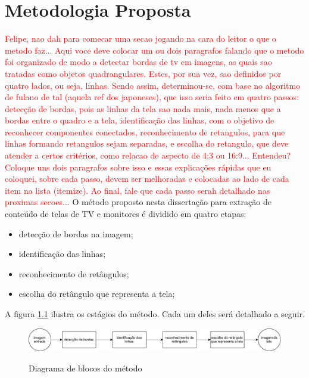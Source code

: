 
\chapter{Metodologia Proposta} \label{met}

\textcolor{red}{Felipe, nao dah para comecar uma secao jogando na cara do leitor o que o metodo faz... Aqui voce deve colocar um ou dois paragrafos falando que o metodo foi organizado de modo a detectar bordas de tv em imagens, as quais sao tratadas como objetos quadrangulares. Estes, por sua vez, sao definidos por quatro lados, ou seja, linhas. Sendo assim, determinou-se, com base no algoritmo de fulano de tal (aquela ref dos japoneses), que isso seria feito em quatro passos: detecção de bordas, pois as linhas da tela sao nada mais, nada menos que a bordas entre o quadro e a tela, identificação das linhas, com o objetivo de reconhecer componentes conectados, reconhecimento de retangulos, para que linhas formando retangulos sejam separadas, e escolha do retangulo, que deve atender a certos critérios, como relacao de aspecto de 4:3 ou 16:9... Entendeu? Coloque uns dois paragrafos sobre isso e essas explicações rápidas que eu coloquei, sobre cada passo, devem ser melhoradas e colocadas ao lado de cada item na lista (itemize). Ao final, fale que cada passo serah detalhado nas proximas secoes...}
O método proposto nesta dissertação para extração de conteúdo de telas de TV e monitores é dividido em quatro etapas:

\begin{itemize}
 \item detecção de bordas na imagem;
 \item identificação das linhas;
 \item reconhecimento de retângulos;
 \item escolha do retângulo que representa a tela;
\end{itemize}

A figura \ref{diag} ilustra os estágios do método. Cada um deles será detalhado a seguir.


\begin{figure} [h]
\includegraphics[width = \textwidth]{figuras/diag.pdf} \label{diag} \caption{Diagrama de blocos do método}
\end{figure} 

